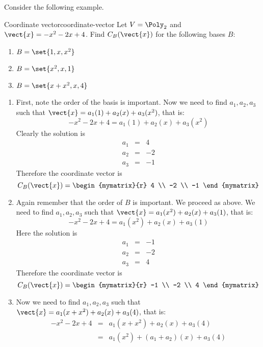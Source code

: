 Consider the following example.

\begin{example}{Coordinate vector}{coordinate-vector}
Let $V = \Poly_2$ and $\vect{x} = -x^2 -2x + 4$. 
Find $C_B(\vect{x})$ for the following bases $B$:
\begin{enumerate}
\item $B = \set{1, x, x^2 }$
\item $B = \set{x^2, x, 1 }$
\item $B = \set{x + x^2 , x , 4 }$
\end{enumerate}
\end{example}

\begin{solution}
\begin{enumerate}
\item
First, note the order of the basis is important.
Now we need to find $a_1, a_2, a_3$ such that $\vect{x} = a_1 (1) + a_2 (x) + a_3(x^2)$, that is:
\[
-x^2 -2x + 4 = a_1 (1) + a_2 (x) + a_3(x^2)
\]
Clearly the solution is
\begin{eqnarray*}
a_1 &=& 4 \\
a_2 &=& -2 \\
a_3 &=& -1
\end{eqnarray*}
Therefore the coordinate vector is
\[
C_B(\vect{x}) = 
\begin{mymatrix}{r}
4 \\
-2 \\
-1
\end{mymatrix}
\]

\item
Again remember that the order of $B$ is important. We proceed as above. 
We need to find $a_1, a_2, a_3$ such that $\vect{x} = a_1 (x^2) + a_2 (x) + a_3(1)$, that is:
\[
-x^2 -2x + 4 = a_1 (x^2) + a_2 (x) + a_3(1)
\]
Here the solution is
\begin{eqnarray*}
a_1 &=& -1 \\
a_2 &=& -2 \\
a_3 &=& 4
\end{eqnarray*}
Therefore the coordinate vector is
\[
C_B(\vect{x}) = 
\begin{mymatrix}{r}
-1 \\
-2 \\
4
\end{mymatrix}
\]

\item 
Now we need to find $a_1, a_2, a_3$ such that $\vect{x} = a_1 (x + x^2) + a_2 (x) + a_3(4)$, that is:
\begin{eqnarray*}
-x^2 -2x + 4 &=& a_1 (x + x^2 ) + a_2 (x) + a_3(4)\\
&=& a_1 (x^2) + (a_1 + a_2) (x) + a_3(4)
\end{eqnarray*}


\end{enumerate}
\end{solution}
